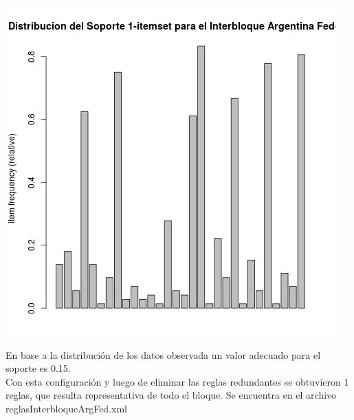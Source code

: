 \documentclass{endm}
\begin{document}
\begin{center}
\includegraphics[scale=0.4]{graficos/soportesInterbloquesArgentinaFederal.png}
\end{center}

En base a la distribución de los datos observada un valor adecuado para el soporte es 0.15.\\

Con esta configuración y luego de eliminar las reglas redundantes se obtuvieron 1 reglas, que resulta representativa de todo el bloque. Se encuentra en el archivo reglasInterbloqueArgFed.xml  \\
\end{document}
